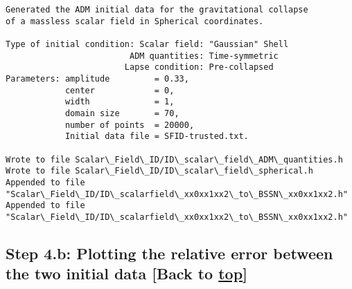 \documentclass[landscape,letterpaper,10pt,english]{article}
\begin{document}
    \begin{Verbatim}[commandchars=\\\{\}]
Generated the ADM initial data for the gravitational collapse
of a massless scalar field in Spherical coordinates.

Type of initial condition: Scalar field: "Gaussian" Shell
                         ADM quantities: Time-symmetric
                        Lapse condition: Pre-collapsed
Parameters: amplitude         = 0.33,
            center            = 0,
            width             = 1,
            domain size       = 70,
            number of points  = 20000,
            Initial data file = SFID-trusted.txt.

Wrote to file Scalar\_Field\_ID/ID\_scalar\_field\_ADM\_quantities.h
Wrote to file Scalar\_Field\_ID/ID\_scalar\_field\_spherical.h
Appended to file "Scalar\_Field\_ID/ID\_scalarfield\_xx0xx1xx2\_to\_BSSN\_xx0xx1xx2.h"
Appended to file "Scalar\_Field\_ID/ID\_scalarfield\_xx0xx1xx2\_to\_BSSN\_xx0xx1xx2.h"
    \end{Verbatim}

    \hypertarget{step-4.b-plotting-the-relative-error-between-the-two-initial-data-back-to-top}{%
\subsection{\texorpdfstring{Step 4.b: Plotting the relative error
between the two initial data {[}Back to
\hyperref[toc]{top}{]}}{Step 4.b: Plotting the relative error between the two initial data {[}Back to {]}}}\label{step-4.b-plotting-the-relative-error-between-the-two-initial-data-back-to-top}}

\[\label{relative_error}\]
\end{document}
